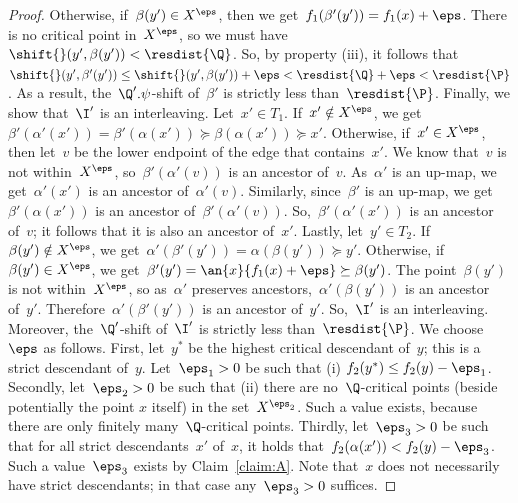 \begin{proof}
    Otherwise, if~$\beta(y') \in X^\eps$, then we get~$f_1(\beta'(y')) = f_1(x) + \eps$.
    There is no critical point in~$X^\eps$, so we must have~$\shift{}(y', \beta(y')) < \resdist{\Q}$.
    So, by property (iii), it follows that~$\shift{}(y', \beta'(y')) \le \shift{}(y', \beta(y')) + \eps < \resdist{\Q} + \eps < \resdist{\P}$.
    As a result, the~$\Q'.\psi$-shift of~$\beta'$ is strictly less than~$\resdist{\P}$.
%
    Finally, we show that~$\I'$ is an interleaving.
    Let~$x' \in T_1$.
    If~$x' \notin X^\eps$, we get~$\beta'(\alpha'(x')) = \beta'(\alpha(x')) \succeq \beta(\alpha(x')) \succeq x'$.
    Otherwise, if~$x' \in X^\eps$, then let~$v$ be the lower endpoint of the edge that contains~$x'$.
    We know that~$v$ is not within~$X^\eps$, so~$\beta'(\alpha'(v))$ is an ancestor of~$v$.
    As~$\alpha'$ is an up-map, we get~$\alpha'(x')$ is an ancestor of~$\alpha'(v)$.
    Similarly, since~$\beta'$ is an up-map, we get~$\beta'(\alpha(x'))$ is an ancestor of~$\beta'(\alpha'(v))$.
    So,~$\beta'(\alpha'(x'))$ is an ancestor of~$v$; it follows that it is also an ancestor of~$x'$.
    Lastly, let~$y' \in T_2$.
    If~$\beta(y') \notin X^\eps$, we get~$\alpha'(\beta'(y')) = \alpha(\beta(y')) \succeq y'$.
    Otherwise, if~$\beta(y') \in X^\eps$, we get~$\beta'(y') = \an{x}{f_1(x) + \eps} \succeq \beta(y')$.
    The point~$\beta(y')$ is not within~$X^\eps$, so as~$\alpha'$ preserves ancestors,~$\alpha'(\beta(y'))$ is an ancestor of~$y'$.
    Therefore~$\alpha'(\beta'(y'))$ is an ancestor of~$y'$.
    So,~$\I'$ is an interleaving.
    Moreover, the~$\Q'$-shift of~$\I'$ is strictly less than~$\resdist{\P}$.
%
    We choose~$\eps$ as follows.
    First, let~$y^*$ be the highest critical descendant of~$y$; this is a strict descendant of~$y$.
    Let~$\eps_1 > 0$ be such that (i) $f_2(y^*) \le f_2(y) - \eps_1$.
    Secondly, let~$\eps_2 > 0$ be such that (ii) there are no~$\Q$-critical points (beside potentially the point $x$ itself) in the set~$X^{\eps_2}$.
    Such a value exists, because there are only finitely many~$\Q$-critical points.
    Thirdly, let~$\eps_3 > 0$ be such that for all strict descendants~$x'$ of~$x$, it holds that~$f_2(\alpha(x')) < f_2(y) - \eps_3$.
    Such a value~$\eps_3$ exists by Claim~\ref{claim:A}.
    Note that~$x$ does not necessarily have strict descendants; in that case any~$\eps_3 > 0$ suffices.

\end{proof}
